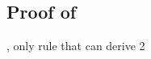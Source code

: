 


\subsection*{Proof of }

\begin{derivation}
     {\premof{\Rcxodec}, only rule that can derive 2}
\end{derivation}








